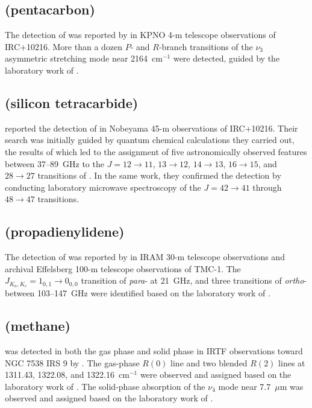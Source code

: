 \documentclass[twocolumn]{aastex631}
\begin{document}
	\subsection{ (pentacarbon)}
	\label{C5}
	
	The detection of  was reported by \citet{Bernath:1989md} in KPNO 4-m telescope observations of IRC+10216.  More than a dozen $P$- and $R$-branch transitions of the $\nu_3$ asymmetric stretching mode near 2164~cm$^{-1}$ were detected, guided by the laboratory work of \citet{Vala:1989ba}.
	
	\subsection{ (silicon tetracarbide)}
	\label{SiC4}
	
	\citet{Ohishi:1989ic} reported the detection of  in Nobeyama 45-m observations of IRC+10216.  Their search was initially guided by quantum chemical calculations they carried out, the results of which led to the assignment of five astronomically observed features between 37--89~GHz to the $J = 12\rightarrow11$, $13\rightarrow12$, $14\rightarrow13$, $16\rightarrow15$, and $28\rightarrow27$ transitions of .  In the same work, they confirmed the detection by conducting laboratory microwave spectroscopy of the $J = 42\rightarrow41$ through $48\rightarrow47$ transitions.
	
	\subsection{ (propadienylidene)}
	\label{H2CCC}
	
	The detection of  was reported by \citet{Cernicharo:1991iv} in IRAM 30-m telescope observations and archival Effelsberg 100-m telescope observations \citep{Cernicharo:1987mj} of TMC-1.  The $J_{K_a,K_c} = 1_{0,1}\rightarrow0_{0,0}$ transition of \emph{para}- at 21~GHz, and three transitions of \emph{ortho}- between 103--147~GHz were identified based on the laboratory work of \citet{Vrtilek:1990gr}.
	
	\subsection{ (methane)}
	\label{CH4}
	
	 was detected in both the gas phase and solid phase in IRTF observations toward NGC 7538 IRS 9 by \citet{Lacy:1991fb}.  The gas-phase $R(0)$ line and two blended $R(2)$ lines at 1311.43, 1322.08, and 1322.16~cm$^{-1}$ were observed and assigned based on the laboratory work of \citet{Champion:1989cd}.  The solid-phase absorption of the $\nu_4$ mode  near 7.7~$\mu$m was observed and assigned based on the laboratory work of \citet{dHendecourt:1986wx}.
	
\end{document}
